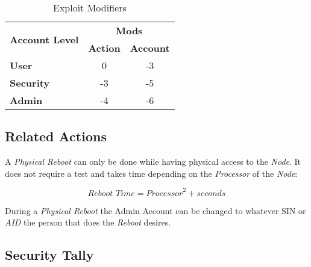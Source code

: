 \begin{table}[htb]
    \caption[Exploit Modifiers]{Exploit Modifiers}
    \label{tab:exploit mods}
    \centering
    \begin{tabular}{lcc}
        \toprule
        \multirow{2}{*}{\textbf{Account Level}} & \multicolumn{2}{c}{\textbf{Mods}}                    \\
        \cmidrule{2-3}
        {}                                      & \textbf{Action}                   & \textbf{Account} \\
        \midrule
        \textbf{User}                           & 0                                 & -3               \\
        \textbf{Security}                       & -3                                & -5               \\
        \textbf{Admin}                          & -4                                & -6               \\
        \bottomrule
    \end{tabular}
\end{table}

\subsection{Related Actions}


A \emph{Physical Reboot} can only be done while having physical access to the
\emph{Node}. It does not require a test and takes time depending on the
\emph{Processor} of the \emph{Node}:

\begin{equation*}
    \textit{Reboot Time} = \textit{Processor}^2 + \textit{seconds}
\end{equation*}

During a \emph{Physical Reboot} the Admin Account can be changed to whatever SIN
or \emph{AID} the person that does the \emph{Reboot} desires.




\subsection{Security Tally}

